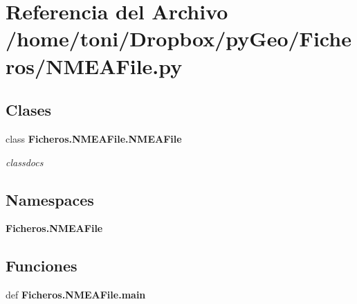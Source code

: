 \section{Referencia del Archivo /home/toni/\-Dropbox/py\-Geo/\-Ficheros/\-N\-M\-E\-A\-File.py}
\label{NMEAFile_8py}
\subsection*{Clases}
\begin{DoxyCompactItemize}
\item 
class {\bf Ficheros.\-N\-M\-E\-A\-File.\-N\-M\-E\-A\-File}
\begin{DoxyCompactList}\small\item\em classdocs \end{DoxyCompactList}\end{DoxyCompactItemize}
\subsection*{Namespaces}
\begin{DoxyCompactItemize}
\item 
{\bf Ficheros.\-N\-M\-E\-A\-File}
\end{DoxyCompactItemize}
\subsection*{Funciones}
\begin{DoxyCompactItemize}
\item 
def {\bf Ficheros.\-N\-M\-E\-A\-File.\-main}
\end{DoxyCompactItemize}
